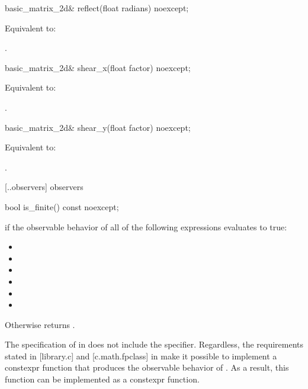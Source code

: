 %
\begin{itemdecl}
basic_matrix_2d& reflect(float radians) noexcept;
\end{itemdecl}
\begin{itemdescr}
\pnum
\effects
Equivalent to: 

\pnum
\returns
{}.
\end{itemdescr}

%
\begin{itemdecl}
basic_matrix_2d& shear_x(float factor) noexcept;
\end{itemdecl}
\begin{itemdescr}
\pnum
\effects
Equivalent to: 

\pnum
\returns
{}.
\end{itemdescr}

%
\begin{itemdecl}
basic_matrix_2d& shear_y(float factor) noexcept;
\end{itemdecl}
\begin{itemdescr}
\pnum
\effects
Equivalent to: 

\pnum
\returns
{}.
\end{itemdescr}

 [\iotwod.\matrixtwod.observers] { observers}

%
\begin{itemdecl}
bool is_finite() const noexcept;
\end{itemdecl}
\begin{itemdescr}
\pnum
\returns
{} if the observable behavior of all of the following expressions evaluates to true:
\begin{itemize}
\item {}
\item {}
\item {}
\item {}
\item {}
\item {}
\end{itemize}

\pnum
Otherwise returns .

\pnum
\begin{note}
The specification of  in \cppseventeen does not include the  specifier. Regardless, the requirements stated in [library.c] and [c.math.fpclass] in \cppseventeen make it possible to implement a constexpr function that produces the observable behavior of . As a result, this function can be implemented as a constexpr function.
\end{note}
\end{itemdescr}


